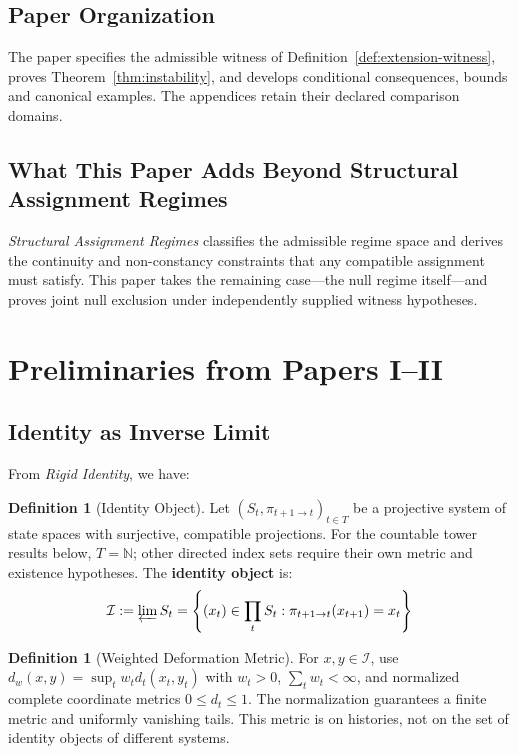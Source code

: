 \documentclass[11pt,a4paper]{article}
\theoremstyle{plain}
\theoremstyle{definition}
\newtheorem{definition}[theorem]{Definition}
\theoremstyle{remark}
\newcommand{\I}{\mathcal{I}}
\newcommand{\dw}{d_w}
\begin{document}
\subsection{Paper Organization}

The paper specifies the admissible witness of Definition~\ref{def:extension-witness}, proves Theorem~\ref{thm:instability}, and develops conditional consequences, bounds and canonical examples. The appendices retain their declared comparison domains.

\subsection{What This Paper Adds Beyond Structural Assignment Regimes}

\textit{Structural Assignment Regimes} classifies the admissible regime space and derives the continuity and non-constancy constraints that any compatible assignment must satisfy. This paper takes the remaining case---the null regime itself---and proves joint null exclusion under independently supplied witness hypotheses.

\section{Preliminaries from Papers I--II}

\subsection{Identity as Inverse Limit}

From \textit{Rigid Identity}, we have:

\begin{definition}[Identity Object]
Let $(S_t, \pi_{t+1 \to t})_{t \in T}$ be a projective system of state spaces with surjective, compatible projections. For the countable tower results below, $T=\mathbb N$; other directed index sets require their own metric and existence hypotheses. The \textbf{identity object} is:
\[
\I := \varprojlim S_t = \left\{ (x_t) \in \prod_t S_t : \pi_{t+1 \to t}(x_{t+1}) = x_t \right\}
\]
\end{definition}

\begin{definition}[Weighted Deformation Metric]
For $x,y\in\I$, use $\dw(x,y)=\sup_t w_t d_t(x_t,y_t)$ with $w_t>0$, $\sum_t w_t<\infty$, and normalized complete coordinate metrics $0\leq d_t\leq1$. The normalization guarantees a finite metric and uniformly vanishing tails. This metric is on histories, not on the set of identity objects of different systems.
\end{definition}
\end{document}
